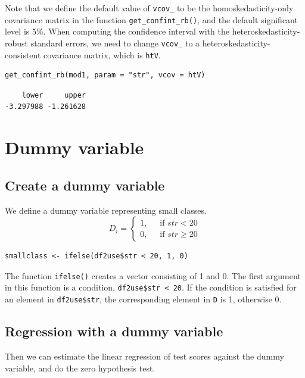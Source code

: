 \documentclass[11pt]{article}
\begin{document}
Note that we define the default value of \texttt{vcov\_} to be the
homoskedasticity-only covariance matrix in the function
\texttt{get\_confint\_rb()}, and the default significant level is 5\%. When
computing the confidence interval with the heteroskedasticity-robust
standard errors, we need to change \texttt{vcov\_} to a
heteroskedasticity-consistent covariance matrix, which is \texttt{htV}.

\begin{verbatim}
get_confint_rb(mod1, param = "str", vcov = htV)
\end{verbatim}

\begin{verbatim}
    lower     upper
-3.297988 -1.261628
\end{verbatim}


\section{Dummy variable}
\label{sec:org1abefc0}

\subsection*{Create a dummy variable}
\label{sec:orgc20ccf8}

We define a dummy variable representing small classes.
\begin{equation*}
D_i =
\begin{cases}
1,\; &\text{ if } str < 20 \\
0,\; &\text{ if } str \geq 20
\end{cases}
\end{equation*}

\begin{verbatim}
smallclass <- ifelse(df2use$str < 20, 1, 0)
\end{verbatim}

The function \texttt{ifelse()} creates a vector consisting of 1 and 0. The
first argument in this function is a condition, \texttt{df2use\$str < 20}. If the
condition is satisfied for an element in \texttt{df2use\$str}, the corresponding
element in \texttt{D} is 1, otherwise 0.


\subsection*{Regression with a dummy variable}
\label{sec:org95594d2}

Then we can estimate the linear regression of test scores against the
dummy variable, and do the zero hypothesis test.
\end{document}
